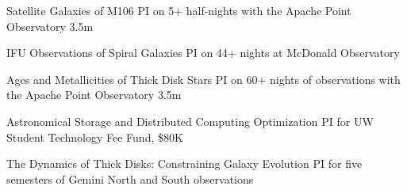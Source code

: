 

{\sc Satellite Galaxies of M106}
PI on 5+ half-nights with the Apache Point Observatory 3.5m

{\sc IFU Observations of Spiral Galaxies}
PI on 44+ nights at McDonald Observatory

{\sc Ages and Metallicities of Thick Disk Stars}
PI on 60+ nights of observations with the Apache Point Observatory 3.5m

{\sc Astronomical Storage and Distributed Computing Optimization}
PI for UW Student Technology Fee Fund, \$80K

{\sc The Dynamics of Thick Disks: Constraining Galaxy Evolution}
PI for five semesters of Gemini North and South observations

